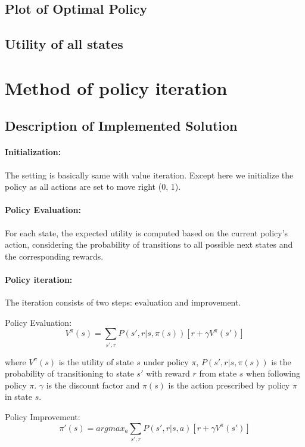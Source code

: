 \documentclass{article}
\begin{document}
\subsection{Plot of Optimal Policy}

\subsection{Utility of all states}

\section{Method of policy iteration}

\subsection{Description of Implemented Solution}

\paragraph{Initialization:} The setting is basically same with value iteration. Except here we initialize the policy as all actions are set to move right (0, 1).

\paragraph{Policy Evaluation:} For each state, the expected utility is computed based on the current policy's action, considering the probability of transitions to all possible next states and the corresponding rewards.

\paragraph{Policy iteration:} The iteration consists of two steps: evaluation and improvement.

Policy Evaluation: 
\[V^\pi (s) = \sum_{s', r} P(s', r|s, \pi(s))[r + \gamma V^\pi (s')] \]

where $V^\pi(s)$ is the utility of state $s$ under policy $\pi$, $P(s', r | s, \pi(s))$ is the probability of transitioning to state $s'$ with reward $r$ from state $s$ when following policy $\pi$. $\gamma$ is the discount factor and $\pi(s)$ is the action prescribed by policy $\pi$ in state $s$.

Policy Improvement:
\[\pi ' (s) = arg max_a \sum_{s', r} P(s', r|s, a)[r + \gamma V^\pi (s')] \]
\end{document}
